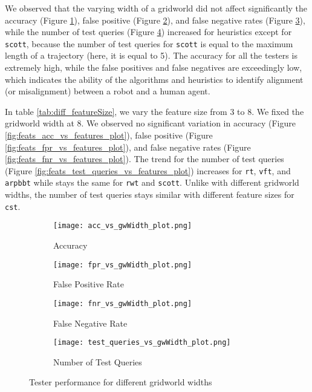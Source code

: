 We observed that the varying width of a gridworld did not affect significantly the accuracy (Figure \ref{fig:acc_vs_gwWidth_plot}), false positive (Figure \ref{fig:fpr_vs_gwWidth_plot}), and false negative rates (Figure \ref{fig:fnr_vs_gwWidth_plot}), while the number of test queries (Figure \ref{fig:test_queries_vs_gwWidth_plot}) increased for heuristics except for \texttt{scott}, because the number of test queries for \texttt{scott} is equal to the maximum length of a trajectory (here, it is equal to 5). The accuracy for all the testers is extremely high, while the false positives and false negatives are exceedingly low, which indicates the ability of the algorithms and heuristics to identify alignment (or misalignment) between a robot and a human agent.

In table \ref{tab:diff_featureSize}, we vary the feature size from 3 to 8. We fixed the gridworld width at 8. We observed no significant variation in accuracy (Figure \ref{fig:feats_acc_vs_features_plot}), false positive (Figure \ref{fig:feats_fpr_vs_features_plot}), and false negative rates (Figure \ref{fig:feats_fnr_vs_features_plot}). The trend for the number of test queries (Figure \ref{fig:feats_test_queries_vs_features_plot}) increases for \texttt{rt}, \texttt{vft}, and \texttt{arpbbt} while stays the same for \texttt{rwt} and \texttt{scott}. Unlike with different gridworld widths, the number of test queries stays similar with different feature sizes for \texttt{cst}. 

\begin{figure}[h]
     \centering
     \begin{subfigure}[h]{0.4\textwidth}
         \centering
         \texttt{[image: acc\_vs\_gwWidth\_plot.png]}
         \caption{Accuracy}
         \label{fig:acc_vs_gwWidth_plot}
     \end{subfigure}
    \hspace{5mm}
     \begin{subfigure}[h]{0.4\textwidth}
         \centering
         \texttt{[image: fpr\_vs\_gwWidth\_plot.png]}
         \caption{False Positive Rate}
         \label{fig:fpr_vs_gwWidth_plot}
     \end{subfigure}
     \hspace{5mm}
     \begin{subfigure}[h]{0.4\textwidth}
         \centering
         \texttt{[image: fnr\_vs\_gwWidth\_plot.png]}
         \caption{False Negative Rate}
         \label{fig:fnr_vs_gwWidth_plot}
     \end{subfigure}
     \hspace{5mm}
    \begin{subfigure}[h]{0.4\textwidth}
         \centering
         \texttt{[image: test\_queries\_vs\_gwWidth\_plot.png]}
         \caption{Number of Test Queries}
         \label{fig:test_queries_vs_gwWidth_plot}
     \end{subfigure}
    \caption{Tester performance for different gridworld widths}
    \label{fig:tester_perf_diff_gwWidth}
\end{figure}

